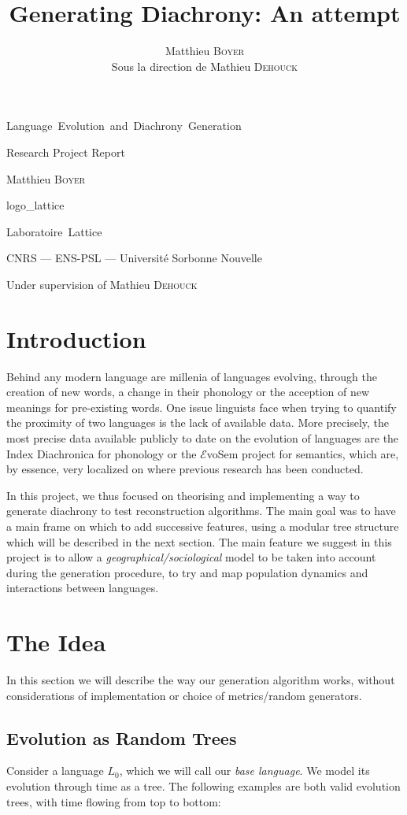\documentclass[math, info, english]{cours}
\title{Generating Diachrony: An attempt}
\author{Matthieu \textsc{Boyer}\\ \Small Sous la direction de Mathieu \textsc{Dehouck}}
\begin{document}
\titlepage %
{}
{\centering %
	{\Huge Language\, Evolution\, and\, Diachrony\, Generation\par}
	\vspace{16pt}
	{\Large Research Project Report\par}
	\vspace{24pt}
	{\huge Matthieu \textsc{Boyer}\par}}
{logo_lattice}
{\centering %
	{\huge\sc Laboratoire\, Lattice \par}
	\vspace{16pt}
	{\large \sc CNRS --- ENS-PSL --- Université Sorbonne Nouvelle\par}
	\vspace{24pt}
	{\Large Under supervision of Mathieu \textsc{Dehouck}\par}}

\section*{Introduction}
Behind any modern language are millenia of languages evolving, through the creation of new words, a change in their phonology or the acception of new meanings for pre-existing words.
One issue linguists face when trying to quantify the proximity of two languages is the lack of available data.
More precisely, the most precise data available publicly to date on the evolution of languages are the Index Diachronica \cite{index} for phonology or the $\mathcal{E}$voSem project \cite{evosem} for semantics, which are, by essence, very localized on where previous research has been conducted.

In this project, we thus focused on theorising and implementing a way to generate diachrony to test reconstruction algorithms.
The main goal was to have a main frame on which to add successive features, using a modular tree structure which will be described in the next section.
The main feature we suggest in this project is to allow a \emph{geographical/sociological} model to be taken into account during the generation procedure, to try and map population dynamics and interactions between languages.

\section{The Idea}
In this section we will describe the way our generation algorithm works, without considerations of implementation or choice of metrics/random generators.
\subsection{Evolution as Random Trees}
Consider a language $L_{0}$, which we will call our \emph{base language}.
We model its evolution through time as a tree. The following examples are both valid evolution trees, with time flowing from top to bottom:
\end{document}
